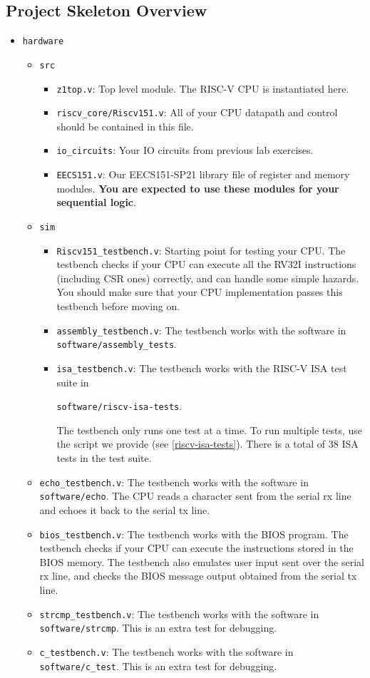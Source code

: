 \documentclass[11pt]{article}
\begin{document}
\subsection{Project Skeleton Overview}
\begin{itemize}
  \item \texttt{hardware}
    \begin{itemize}
      \item \texttt{src}
        \begin{itemize}
          \item \texttt{z1top.v}: Top level module. The RISC-V CPU is instantiated here.
          \item \texttt{riscv\_core/Riscv151.v}: All of your CPU datapath and control should be contained in this file.
          \item \texttt{io\_circuits}: Your IO circuits from previous lab exercises.
          \item \texttt{EECS151.v}: Our EECS151-SP21 library file of register and memory modules. \textbf{You are expected to use these modules for your sequential logic}.
        \end{itemize}
      \item \texttt{sim}
        \begin{itemize}
          \item \verb|Riscv151_testbench.v|: Starting point for testing your CPU. The testbench checks if your CPU can execute all the RV32I instructions (including CSR ones) correctly, and can handle some simple hazards. You should make sure that your CPU implementation passes this testbench before moving on.
          \item \verb|assembly_testbench.v|: The testbench works with the software in \texttt{software/assembly\_tests}.
          \item \verb|isa_testbench.v|: The testbench works with the RISC-V ISA test suite in

\texttt{software/riscv-isa-tests}.

The testbench only runs one test at a time. To run multiple tests, use the script we provide (see \ref{riscv-isa-tests}). There is a total of 38 ISA tests in the test suite.
        \end{itemize}
          \item \verb|echo_testbench.v|: The testbench works with the software in \texttt{software/echo}. The CPU reads a character sent from the serial rx line and echoes it back to the serial tx line.
          \item \verb|bios_testbench.v|: The testbench works with the BIOS program. The testbench checks if your CPU can execute the instructions stored in the BIOS memory. The testbench also emulates user input sent over the serial rx line, and checks the BIOS message output obtained from the serial tx line.
          \item \verb|strcmp_testbench.v|: The testbench works with the software in \texttt{software/strcmp}. This is an extra test for debugging.
          \item \verb|c_testbench.v|: The testbench works with the software in \texttt{software/c\_test}. This is an extra test for debugging.


\end{itemize}
\end{itemize}
\end{document}
